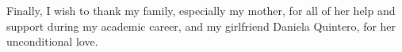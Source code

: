 \documentclass[%
    corpo=13pt,
    twoside,
    oldstyle,
    autoretitolo,
    greek,
    evenboxes,
    numerazioneromana,
    tipotesi=magistrale,
]{toptesi}
\begin{document}
\vspace{7pt}

Finally, I wish to thank my family, especially my mother, for all of her help and support during my academic career, and my girlfriend Daniela Quintero, for her unconditional love.


\indici

\listoffigures
\listoftables


 \label{listoflist}
\lstlistoflistings

\mainmatter










\end{document}
